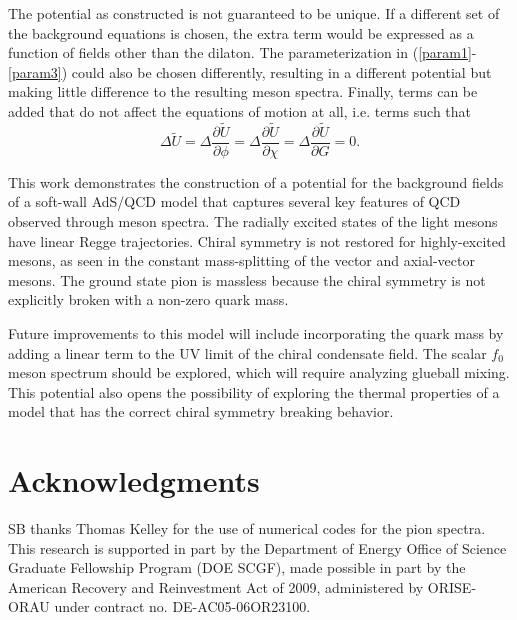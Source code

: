 \documentclass[12pt]{article}
\newcommand{\be}{\begin{equation}}
\newcommand{\ee}{\end{equation}}
\begin{document}
The potential as constructed is not guaranteed to be unique.
If a different set of the background equations is chosen, the extra term would be expressed as a function of fields other than the dilaton.
The parameterization in (\ref{param1}-\ref{param3}) could also be chosen differently, resulting in a different potential but making little difference to the resulting meson spectra.
Finally, terms can be added that do not affect the equations of motion at all, i.e. terms such that 
\be
\Delta \tilde{U} = \Delta \frac{\partial \tilde{U}}{\partial \phi} = \Delta \frac{\partial \tilde{U}}{\partial \chi} = \Delta \frac{\partial \tilde{U}}{\partial G} =0.
\ee

This work demonstrates the construction of a potential for the background fields of a soft-wall AdS/QCD model that captures several key features of QCD observed through meson spectra.
The radially excited states of the light mesons have linear Regge trajectories.
Chiral symmetry is not restored for highly-excited mesons, as seen in the constant mass-splitting of the vector and axial-vector mesons.
The ground state pion is massless because the chiral symmetry is not explicitly broken with a non-zero quark mass.

Future improvements to this model will include incorporating the quark mass by adding a linear term to the UV limit of the chiral condensate field.
The scalar $f_0$ meson spectrum should be explored, which will require analyzing glueball mixing.
This potential also opens the possibility of exploring the thermal properties of a model that has the correct chiral symmetry breaking behavior.


\section*{Acknowledgments}
SB thanks Thomas Kelley for the use of numerical codes for the pion spectra.
This research is supported in part by the Department of Energy Office of Science Graduate Fellowship Program (DOE SCGF), made possible in part by  the American Recovery and Reinvestment Act of 2009, administered by ORISE-ORAU under contract no. DE-AC05-06OR23100.
\end{document}
